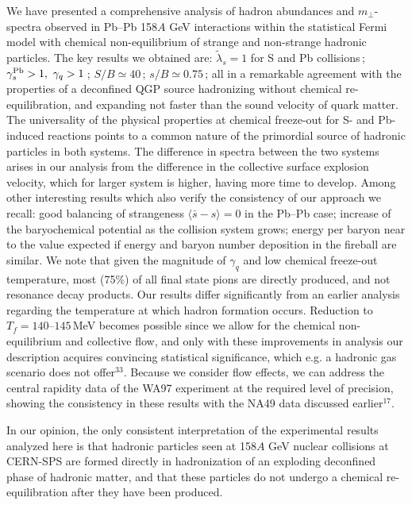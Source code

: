 \begin{mdframed}[linecolor=gray,roundcorner=12pt,backgroundcolor=Dandelion!15,linewidth=1pt,leftmargin=0cm,rightmargin=0cm,topline=true,bottomline=true,skipabove=12pt]
We have presented a comprehensive analysis of hadron abundances and $m_\bot$-spectra observed in Pb--Pb 158$A$ GeV interactions within the statistical Fermi model with chemical non-equilibrium of strange and non-strange hadronic particles. The key results we obtained are: $\tilde \lambda_s=1$ for S and Pb collisions\,; $\gamma_s^{\rm Pb}>1, \ \gamma_q>1$\,; $S/B\simeq 40$\,; $ s/B\simeq 0.75$\,; all in a remarkable agreement with the properties of a deconfined QGP source hadronizing without chemical re-equilibration, and expanding not faster than the sound velocity of quark matter. The universality of the physical properties at chemical freeze-out for S- and Pb-induced reactions points to a common nature of the primordial source of hadronic particles in both systems. The difference in spectra between the two systems arises in our analysis from the difference in the collective surface explosion velocity, which for larger system is higher, having more time to develop. Among other interesting results which also verify the consistency of our approach we recall: good balancing of strangeness $\langle \bar s-s\rangle=0$ in the Pb--Pb case; increase of the baryochemical potential as the collision system grows; energy per baryon near to the value expected if energy and baryon number deposition in the fireball are similar. We note that given the magnitude of $\gamma_q$ and low chemical freeze-out temperature, most (75\%) of all final state pions are directly produced, and not resonance decay products. Our results differ significantly from an earlier analysis regarding the temperature at which hadron formation occurs. Reduction to $T_f=140$--$145$\,MeV becomes possible since we allow for the chemical non-equilibrium and collective flow, and only with these improvements in analysis our description acquires convincing statistical significance, which e.g. a hadronic gas scenario does not offer$^{33}$. Because we consider flow effects, we can address the central rapidity data of the WA97 experiment at the required level of precision, showing the consistency in these results with the NA49 data discussed earlier$^{17}$. 

In our opinion, the only consistent interpretation of the experimental results analyzed here is that hadronic particles seen at 158$A$ GeV nuclear collisions at CERN-SPS are formed directly in hadronization of an exploding deconfined phase of hadronic matter, and that these particles do not undergo a chemical re-equilibration after they have been produced. 


\footnotetext{\vspace*{-0.5cm}
\begin{enumerate}


\end{enumerate}}
\end{mdframed}
